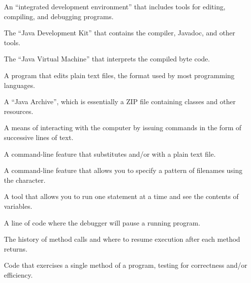 \begin{description}

An ``integrated development environment'' that includes tools for editing, compiling, and debugging programs.

The ``Java Development Kit'' that contains the compiler, Javadoc, and other tools.

The ``Java Virtual Machine'' that interprets the compiled byte code.

A program that edits plain text files, the format used by most programming languages.

A ``Java Archive'', which is essentially a ZIP file containing classes and other resources.

A means of interacting with the computer by issuing commands in the form of successive lines of text.

A command-line feature that substitutes  and/or  with a plain text file.

A command-line feature that allows you to specify a pattern of filenames using the {\tt *} character.

A tool that allows you to run one statement at a time and see the contents of variables.

A line of code where the debugger will pause a running program.

The history of method calls and where to resume execution after each method returns.

Code that exercises a single method of a program, testing for correctness and/or efficiency.

\end{description}
